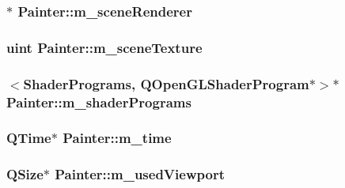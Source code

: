 \subsubsection[{m\+\_\+scene\+Renderer}]{$\ast$ Painter\+::m\+\_\+scene\+Renderer\hspace{0.3cm}{\ttfamily [protected]}}\label{class_painter_a574ba64fd2af1d8c64d2c293d4811fc2}
\hypertarget{class_painter_af82c25060227ea6ec91ae60f0753c593}{}
\subsubsection[{m\+\_\+scene\+Texture}]{\setlength{\rightskip}{0pt plus 5cm}uint Painter\+::m\+\_\+scene\+Texture\hspace{0.3cm}{\ttfamily [protected]}}\label{class_painter_af82c25060227ea6ec91ae60f0753c593}
\hypertarget{class_painter_a30655a30ba8f540f0e28b976b97d126f}{}
\subsubsection[{m\+\_\+shader\+Programs}]{$<${\bf Shader\+Programs}, Q\+Open\+G\+L\+Shader\+Program$\ast$$>$$\ast$ Painter\+::m\+\_\+shader\+Programs\hspace{0.3cm}{\ttfamily [protected]}}\label{class_painter_a30655a30ba8f540f0e28b976b97d126f}
\hypertarget{class_painter_ab6976ab19027866bbb01e9a1504aa5c9}{}
\subsubsection[{m\+\_\+time}]{\setlength{\rightskip}{0pt plus 5cm}Q\+Time$\ast$ Painter\+::m\+\_\+time\hspace{0.3cm}{\ttfamily [protected]}}\label{class_painter_ab6976ab19027866bbb01e9a1504aa5c9}
\hypertarget{class_painter_aff5d274eb90d7a94565effe5bd5d03f7}{}
\subsubsection[{m\+\_\+used\+Viewport}]{\setlength{\rightskip}{0pt plus 5cm}Q\+Size$\ast$ Painter\+::m\+\_\+used\+Viewport\hspace{0.3cm}{\ttfamily [protected]}}\label{class_painter_aff5d274eb90d7a94565effe5bd5d03f7}


